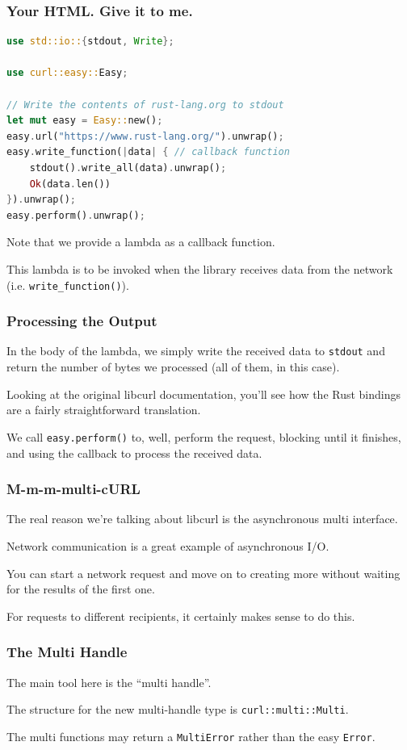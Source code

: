 \begin{frame}[fragile]
\frametitle{Your HTML. Give it to me.}

\begin{lstlisting}[language=Rust]
use std::io::{stdout, Write};

use curl::easy::Easy;

// Write the contents of rust-lang.org to stdout
let mut easy = Easy::new();
easy.url("https://www.rust-lang.org/").unwrap();
easy.write_function(|data| { // callback function
    stdout().write_all(data).unwrap();
    Ok(data.len())
}).unwrap();
easy.perform().unwrap();
\end{lstlisting}

Note that we provide a lambda as a callback function. 

This lambda is to be invoked
when the library receives data from the network (i.e. \texttt{write\_function()}).

\end{frame}


\begin{frame}
\frametitle{Processing the Output}

In the body of the lambda, we simply write the received data to \texttt{stdout}
and return the number of bytes we processed (all of them, in this case).


Looking at the original libcurl documentation, you'll see how the Rust bindings are a fairly straightforward translation.

We call \texttt{easy.perform()} to, well, perform the request, blocking until it finishes, and using the callback to process the received data.


\end{frame}


\begin{frame}
\frametitle{M-m-m-multi-cURL}
The real reason we're talking about libcurl is the asynchronous multi interface.

Network communication is a great example of asynchronous I/O.


You can start a network request and move on to creating more without waiting for the results of the first one. 

For requests to different recipients, it certainly makes sense to do this.

\end{frame}



\begin{frame}
\frametitle{The Multi Handle}

The main tool here is the ``multi handle''.

The structure for the new multi-handle type is \texttt{curl::multi::Multi}.

The multi functions may return a \texttt{MultiError} rather than the easy \texttt{Error}.

\end{frame}


